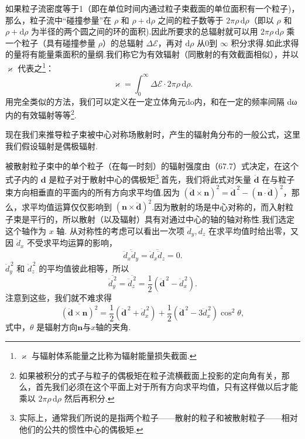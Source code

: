 如果粒子流密度等于1（即在单位时间内通过粒子束截面的单位面积有一个粒子)，那么，粒子流中“碰撞参量”在 $\rho$ 和 $\rho+\mathrm{d}\rho$ 之间的粒子数等于 $2\pi\rho\,\mathrm{d}\rho$（即以 $\rho$ 和 $\rho+\mathrm{d}\rho$ 为半径的两个圆之间的环的面积).因此所要求的总辐射就可以用 $2\pi\rho\,\mathrm{d}\rho$ 乘一个粒子（具有碰撞参量 $\rho$）的总辐射 $\Delta\mathcal{E}$，再对 $\mathrm{d}\rho$ 从0到 $\infty$ 积分求得.如此求得的量将有能量乘面积的量纲.我们称它为有效辐射（同散射的有效截面相似），并以 $\varkappa$ 代表之\footnote{$\varkappa$ 与辐射体系能量之比称为辐射能量损失截面.}：
\begin{equation}
  \varkappa=\int_0^{\infty}\Delta\mathcal{E}\cdot 2\pi\rho\,\mathrm{d}\rho.
\end{equation}
用完全类似的方法，我们可以定义在一定立体角元do内，和在一定的频率间隔 dω 内的有效辐射等等\footnote{如果被积分的式子与粒子的偶极矩在粒子流横截面上投影的定向角有关，那么，首先我们必须在这个平面上对于所有方向求平均值，只有这样做以后才能乘以 $2\pi\rho\,\mathrm{d}\rho$ 然后再积分.}.

现在我们来推导粒子束被中心对称场散射时，产生的辐射角分布的一般公式，这里我们假设辐射是偶极辐射.

被散射粒子束中的单个粒子（在每一时刻）的辐射强度由（67.7）式决定，在这个式子内的 $\boldsymbol{d}$ 是粒子对于散射中心的偶极矩\footnote{实际上，通常我们所说的是指两个粒子——散射的粒子和被散射粒子——相对他们的公共的惯性中心的偶极矩.}.首先，我们将此式对矢量 $\ddot{\boldsymbol{d}}$ 在与粒子束方向相垂直的平面内的所有方向求平均值.因为 $(\ddot{\boldsymbol{d}}\times\boldsymbol{n})^2=\ddot{\boldsymbol{d}}^{\,2}-(\boldsymbol{n}\cdot\ddot{\boldsymbol{d}})^2$，那么，求平均值运算仅仅影响到 $(\boldsymbol{n}\times\ddot{\boldsymbol{d}})^2$.因为散射的场是中心对称的，而入射粒子束是平行的，所以散射（以及辐射）具有对通过中心的轴的轴对称性.我们选定这个轴作为 $x$ 轴. 从对称性的考虑可以看出一次项 $\ddot{d}_y,\ddot{d}_z$ 在求平均值时给出零，又因 $\ddot{d}_x$ 不受求平均运算的影响，
\begin{equation*}
  \overline{\ddot{d}_x\ddot{d}_y}=\overline{\ddot{d}_x\ddot{d}_z}=0.
\end{equation*}
$\ddot{d}_y^{\,2}$ 和 $\ddot{d}_z^{\,2}$ 的平均值彼此相等，所以
\begin{equation*}
  \overline{\ddot{d}_y^{\,2}}=\overline{\ddot{d}_z^{\,2}}=\frac{1}{2}(\ddot{\boldsymbol{d}}^{\,2}-\ddot{d}_x^{\,2}).
\end{equation*}
注意到这些，我们就不难求得
\begin{equation*}
  \overline{(\ddot{\boldsymbol{d}}\times\boldsymbol{n})^2}
  =\frac{1}{2}(\ddot{\boldsymbol{d}}^{\,2}+\ddot{d}_x^{\,2})
  +\frac{1}{2}(\ddot{\boldsymbol{d}}^{\,2}-3\ddot{d}_x^{\,2})\cos^2\theta,
\end{equation*}
式中，$\theta$ 是辐射方向$\boldsymbol{n}$与$x$轴的夹角.

